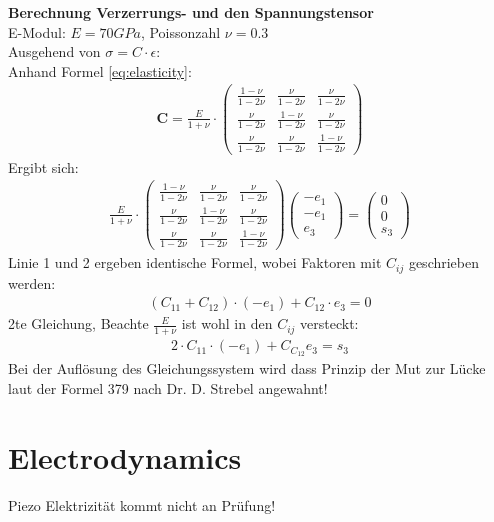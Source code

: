 \documentclass[a4paper, 10pt]{scrartcl}
\begin{document}
\textbf{Berechnung Verzerrungs- und den Spannungstensor}\\
E-Modul: $E = 70 GPa$, Poissonzahl $\nu = 0.3$\\
Ausgehend von $\sigma = C \cdot \epsilon$:\\
Anhand Formel \ref{eq:elasticity}:
\begin{align}
	\mathbf{C} = \frac{E}{1 + \nu} \cdot \begin{pmatrix}
		\frac{1-\nu}{1-2\nu} & \frac{\nu}{1-2\nu} & \frac{\nu}{1-2\nu}\\
		\frac{\nu}{1-2\nu} & \frac{1-\nu}{1-2\nu} & \frac{\nu}{1-2\nu}\\
		\frac{\nu}{1-2\nu} & \frac{\nu}{1-2\nu} & \frac{1-\nu}{1-2\nu}
	\end{pmatrix}
\end{align}
Ergibt sich:
\begin{align}
	\frac{E}{1 + \nu} \cdot \begin{pmatrix}
		\frac{1-\nu}{1-2\nu} & \frac{\nu}{1-2\nu} & \frac{\nu}{1-2\nu}\\
		\frac{\nu}{1-2\nu} & \frac{1-\nu}{1-2\nu} & \frac{\nu}{1-2\nu}\\
		\frac{\nu}{1-2\nu} & \frac{\nu}{1-2\nu} & \frac{1-\nu}{1-2\nu}
	\end{pmatrix}
	\begin{pmatrix}
		-e_1\\ -e_1\\ e_3
	\end{pmatrix}
	=
	\begin{pmatrix}
		0\\ 0\\ s_3
	\end{pmatrix}
\end{align}
Linie 1 und 2 ergeben identische Formel, wobei Faktoren mit $C_{ij}$
geschrieben werden:
\begin{align}
	(C_{11} + C_{12}) \cdot (-e_1) + C_{12} \cdot e_3 = 0
\end{align}
2te Gleichung, Beachte $\frac{E}{1+\nu}$ ist wohl in den $C_{ij}$ versteckt:
\begin{align}
	2 \cdot C_{11} \cdot (-e_1) + C_{C_12} e_3 = s_3
\end{align}
Bei der Auflösung des Gleichungssystem wird dass Prinzip der Mut zur Lücke laut
der Formel 379 nach Dr. D. Strebel angewahnt!



\section{Electrodynamics}
Piezo Elektrizität kommt nicht an Prüfung!\\
\end{document}
